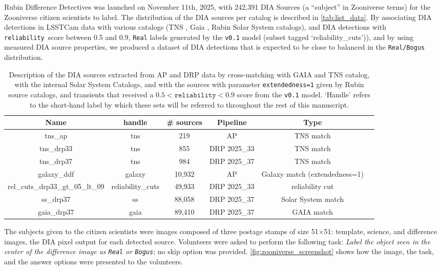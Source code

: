 \documentclass[DM,authoryear,toc]{lsstdoc}
\newcommand{\V}[1]{{\texttt{v0.#1}}}
\newcommand{\rel}{{\texttt{reliability}}}
\begin{document}
Rubin Difference Detectives was launched on November 11th, 2025, with 242,391 DIA Sources (a ``subject'' in Zooniverse terms) for the Zooniverse citizen scientists to label. The distribution of the DIA sources per catalog is described in \autoref{tab:list_data}. By associating DIA detections in LSSTCam data with various catalogs (TNS \citep{tns_cite}, Gaia \citep{rimoldini2023gaia}, Rubin Solar System catalogs), and  DIA detections with \rel\ score between 0.5 and 0.9, \texttt{Real} labels generated by the \V1 model (subset tagged `reliability\_cuts')), and by using measured DIA source properties, we produced a dataset of DIA detections that is expected to be close to balanced in the \texttt{Real/Bogus} distribution.

\begin{table}
\footnotesize
    \centering
    \begin{tabular}{|c|c|c|c|c|c|}
    \hline
        \textbf{Name} & \textbf{handle}&\textbf{\# sources} & \textbf{Pipeline} & \textbf{Type}  \\ \hline
      
        tns\_ap & tns&219 & AP &TNS match\\\hline
        tns\_drp33 &tns&855 & DRP 2025\_33 &TNS match\\\hline
        tns\_drp37 &tns&984 & DRP 2025\_37 &TNS match\\\hline
        galaxy\_ddf & galaxy&10,932 & AP & Galaxy match (extendedness=1) \\ \hline
        rel\_cuts\_drp33\_gt\_05\_lt\_09 & reliability\_cuts&49,933 & DRP 2025\_33 &reliability cut\\\hline
        ss\_drp37 &ss&88,058 &DRP 2025\_37 & Solar System match \\ \hline
        gaia\_drp37 &gaia& 89,410 & DRP 2025\_37 &GAIA match\\\hline
           
    \end{tabular}
    \caption{Description of the DIA sources extracted from AP and DRP data by cross-matching with GAIA and TNS catalog, with the internal Solar System Catalogs, and with the sources with parameter \texttt{extendedness=1} given by Rubin source catalogs, and transients that received a $0.5<\rel<0.9$  score from the \V1 model. `Handle' refers to the short-hand label by which these sets will be referred to throughout the rest of this manuscript.}
    \label{tab:list_data}
\end{table}


The subjects given to the citizen scientists were images composed of three postage stamps of size 51$\times$51: template, science, and difference images, the DIA pixel output for each detected source. Volunteers were asked to perform the following task: \textit{Label the object seen in the center of the difference image as \texttt{Real} or \texttt{Bogus}}; no skip option was provided. \autoref{fig:zooniverse_screenshot} shows how the image, the task, and the answer options were presented to the volunteers. 
\end{document}
